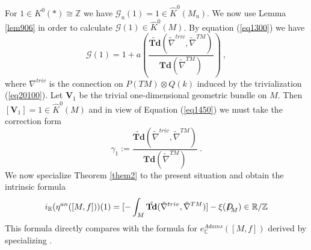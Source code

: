 \documentclass[12pt]{article}
\newcommand{\cG}{{\mathcal{G}}}
\newcommand{\Z}{{\mathbb{Z}}}
\newcommand{\R}{{\mathbb{R}}}
\newcommand{\C}{{\mathbb{C}}}
\newcommand{\Td}{{\mathbf{Td}}}
\newcommand{\bV}{{\mathbf{V}}}
\newcommand{\Dirac}{{D\hspace{-0.27cm}/}}
\begin{document}
 For $1\in K^{0}(*)\cong \Z$ we have $\cG_{u}(1)=1\in \hat K^{0}(M_{u})$. We now use Lemma \ref{lem906} in order to calculate
$\cG(1)\in \hat K^{0}(M)$. 
  By equation (\ref{eq1300}) we have
$$\cG(1)=1+a\left(\frac{\tilde \Td(\tilde \nabla^{triv},\tilde \nabla^{TM})}{\Td(\tilde \nabla^{TM})}\right)\ ,$$
where $\nabla^{triv}$ is the connection on $P(TM)\otimes Q(k)$ induced by the trivialization (\ref{eq20100}).
Let $\bV_{1}$ be the trivial one-dimensional geometric bundle on $M$. Then
$[\bV_{1}]=1\in \hat K^{0}(M)$ and in view of Equation (\ref{eq1450}) we must take the correction form 
$$\gamma_{1}:=\frac{\tilde \Td(\tilde \nabla^{triv},\tilde \nabla^{TM})}{\Td(\tilde \nabla^{TM})}\ .$$
We now specialize Theorem \ref{them2} to the present situation and obtain the intrinsic formula 
\begin{equation}\label{hfjhgerjfgjerferffref} i_{\R}(\eta^{an}([M,f]))(1)=[-\int_{M}\tilde \Td(\tilde \nabla^{triv},\tilde \nabla^{TM})]-\xi(\Dirac_{M})\in \R/\Z
\end{equation} This formula directly compares with the formula for $e_{\C}^{Adams}([M,f])$  derived by specializing \cite[Thm 4.14]{MR0397798}.





 







 


  
 
 
 
 



%





\end{document}
